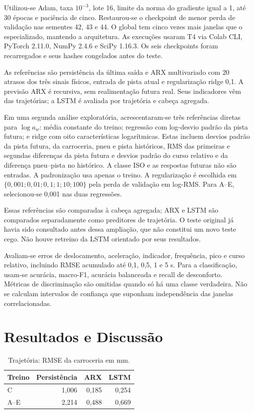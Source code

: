 \documentclass[conference]{IEEEtran}
\begin{document}
Utilizou-se Adam, taxa $10^{-3}$, lote 16, limite da norma do gradiente igual a 1, até 30 épocas e paciência de cinco. Restaurou-se o checkpoint de menor perda de validação nas sementes 42, 43 e 44. O global tem cinco vezes mais janelas que o especializado, mantendo a arquitetura. As execuções usaram T4 via Colab CLI, PyTorch 2.11.0, NumPy 2.4.6 e SciPy 1.16.3. Os seis checkpoints foram recarregados e seus hashes congelados antes do teste.

As referências são persistência da última saída e ARX multivariado com 20 atrasos dos três sinais físicos, entrada de pista atual e regularização ridge 0,1. A previsão ARX é recursiva, sem realimentação futura real. Seus indicadores vêm das trajetórias; a LSTM é avaliada por trajetória e cabeça agregada.

Em uma segunda análise exploratória, acrescentaram-se três referências diretas para $\log a_w$: média constante do treino; regressão com log-desvio padrão da pista futura; e ridge com oito características logarítmicas. Estas incluem desvios padrão da pista futura, da carroceria, pneu e pista históricos, RMS das primeiras e segundas diferenças da pista futura e desvios padrão do curso relativo e da diferença pneu--pista no histórico. A classe ISO e as respostas futuras não são entradas. A padronização usa apenas o treino. A regularização é escolhida em $\{0{,}001;0{,}01;0{,}1;1;10;100\}$ pela perda de validação em log-RMS. Para A--E, selecionou-se 0,001 nas duas regressões.

Essas referências são comparadas à cabeça agregada; ARX e LSTM são comparados separadamente como preditores de trajetória. O teste original já havia sido consultado antes dessa ampliação, que não constitui um novo teste cego. Não houve retreino da LSTM orientado por seus resultados.

Avaliam-se erros de deslocamento, aceleração, indicador, frequência, pico e curso relativo, incluindo RMSE acumulado até 0,1, 0,5, 1 e 5 s. Para a classificação, usam-se acurácia, macro-F1, acurácia balanceada e recall de desconforto. Métricas de discriminação são omitidas quando só há uma classe verdadeira. Não se calculam intervalos de confiança que suponham independência das janelas correlacionadas.

\section{Resultados e Discussão}
\begin{table}[t]
\caption{Trajetória: RMSE da carroceria em mm.}
\centering
\begin{tabular}{lrrr}\toprule
Treino & Persistência & ARX & LSTM\\\midrule
C & 1,006 & 0,185 & 0,254\\
A--E & 2,214 & 0,488 & 0,669\\\bottomrule
\end{tabular}
\label{tab:results}
\end{table}
\end{document}
